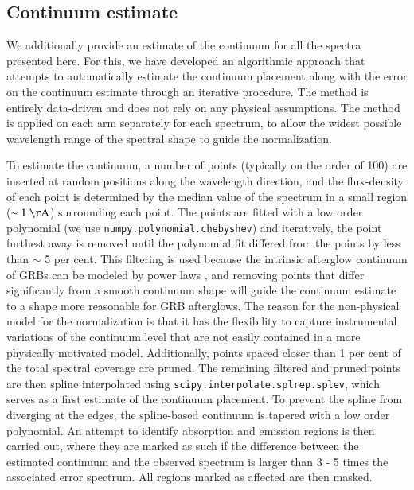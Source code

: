 \documentclass[longauth]{aa}    %
\begin{document}
\subsection{Continuum estimate} \label{continuum}

We additionally provide an estimate of the continuum for all the spectra
presented here. For this, we have developed an algorithmic approach that
attempts to automatically estimate the continuum placement along with the error
on the continuum estimate through an iterative procedure. The method is entirely
data-driven and does not rely on any physical assumptions. The method is applied
on each arm separately for each spectrum, to allow the widest possible
wavelength range of the spectral shape to guide the normalization.

To estimate the continuum, a number of points (typically on the order of 100)
are inserted at random positions along the wavelength direction, and the
flux-density of each point is determined by the median value of the spectrum in
a small region ($\sim 1~\mathrm{\AA}$) surrounding each point. The points are
fitted with a low order polynomial (we use \texttt{numpy.polynomial.chebyshev})
and iteratively, the point furthest away is removed until the polynomial fit
differed from the points by less than $\sim$ 5 per cent. This filtering is used
because the intrinsic afterglow continuum of GRBs can be modeled by power laws
\citep{Piran2005}, and removing points that differ significantly from a smooth
continuum shape will guide the continuum estimate to a shape more reasonable for
GRB afterglows. The reason for the non-physical model for the normalization is
that it has the flexibility to capture instrumental variations of the continuum
level that are not easily contained in a more physically motivated model.
Additionally, points spaced closer than 1 per cent of the total spectral
coverage are pruned. The remaining filtered and pruned points are then spline
interpolated using \texttt{scipy.interpolate.splrep.splev}, which serves as a
first estimate of the continuum placement. To prevent the spline from diverging
at the edges, the spline-based continuum is tapered with a low order polynomial.
An attempt to identify absorption and emission regions is then carried out,
where they are marked as such if the difference between the estimated continuum
and the observed spectrum is larger than 3 - 5 times the associated error
spectrum. All regions marked as affected are then masked.
\end{document}
